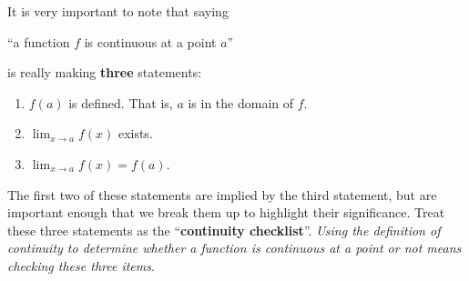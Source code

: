 \documentclass{ximera}
\begin{document}
It is very important to note that saying
\begin{center}
  ``a function $f$ is continuous at a point $a$''
\end{center}
is really making \textbf{three} statements:
\begin{enumerate}
	\item $f(a)$ is defined.  That is, $a$ is in the domain of $f$.
	\item $\lim_{x\to a} f(x)$ exists.
	\item $\lim_{x\to a} f(x) = f(a)$.
\end{enumerate}

The first two of these statements are implied by the third statement, but are important enough that we break them up
to highlight their significance. Treat these three statements as the ``\textbf{continuity checklist}''. \emph{Using the definition of continuity to determine whether a function is continuous at a point or not means checking these three items}.
\end{document}
